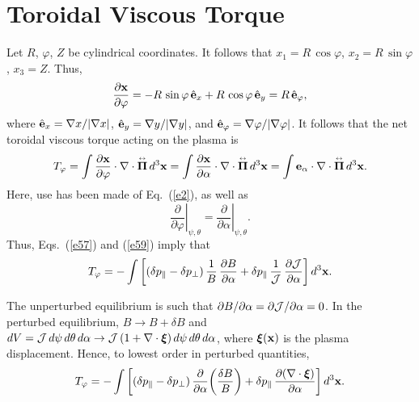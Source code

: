 \documentclass[12pt,prb,aps,notitlepage]{revtex4-1}
\newcommand{\bxi}{\mbox{\boldmath$\xi$}}
\newcommand{\bPi}{\mbox{\boldmath$\Pi$}}
\newcommand{\smalltensor}[1]{\overset{\text{\tiny$\leftrightarrow$}}{#1}}
\begin{document}
\section{Toroidal Viscous Torque}
 Let $R$, $\varphi$, $Z$ be cylindrical coordinates. It follows that $x_1=R\,\cos\varphi$, $x_2=R\,\sin\varphi$, $x_3=Z$. Thus,
 \begin{equation}
 \frac{\partial {\bf x}}{\partial\varphi} = -R\,\sin\varphi\,\hat{\bf e}_x+R\,\cos\varphi\,\hat{\bf e}_y= R\,\hat{\bf e}_\varphi,
 \end{equation}
 where $\hat{\bf e}_x=\nabla x/|\nabla x|$, $\hat{\bf e}_y=\nabla y/|\nabla y|$, and $\hat{\bf e}_\varphi=\nabla \varphi/|\nabla \varphi|$. 
 It follows that the net toroidal viscous torque acting on the plasma is
 \begin{equation}\label{e59}
 T_\varphi = \int  \frac{\partial {\bf x}}{\partial\varphi} \cdot\nabla\cdot \smalltensor{\bPi}\,d^3{\bf x}= \int  \frac{\partial {\bf x}}{\partial\alpha} \cdot\nabla\cdot \smalltensor{\bPi}\,d^3{\bf x} = \int  {\bf e}_\alpha \cdot\nabla\cdot \smalltensor{\bPi}\,d^3{\bf x}.
 \end{equation}
 Here, use has been made of Eq.~(\ref{e2}), as well as 
 \begin{equation}
 \left.\frac{\partial}{\partial\varphi}\right|_{\psi,\theta} = \left.\frac{\partial}{\partial\alpha}\right|_{\psi,\theta}.
 \end{equation}
 Thus, Eqs.~(\ref{e57}) and (\ref{e59}) imply that
 \begin{equation}
 T_\varphi = -\int \left[(\delta p_\parallel-\delta p_\perp)\,\frac{1}{B}\,\frac{\partial B}{\partial \alpha}+\delta p_\parallel\,\frac{1}{{\cal J}}\,\frac{\partial{\cal J}}{\partial \alpha}\right]d^3{\bf x}.
 \end{equation}
 
 The unperturbed equilibrium is such that $\partial B/\partial \alpha =\partial{\cal J}/\partial\alpha=0$. In the perturbed equilibrium, 
 $B\rightarrow B+\delta B$ and 
 $dV= {\cal J}\,d\psi\,d\theta\,d\alpha\rightarrow {\cal J}\,(1+\nabla\cdot\bxi)\,d\psi\,d\theta\,d\alpha$, where $\bxi({\bf x})$ is the plasma displacement. Hence,
 to lowest order in perturbed quantities, 
 \begin{equation}\label{e62}
 T_\varphi = -\int \left[(\delta p_\parallel-\delta p_\perp)\,\frac{\partial}{\partial \alpha}\!\left(\frac{\delta B}{B}\right)+\delta p_\parallel\,\frac{\partial(\nabla\cdot\bxi)}{\partial \alpha}\right]d^3{\bf x}.
 \end{equation}
 
\end{document}
